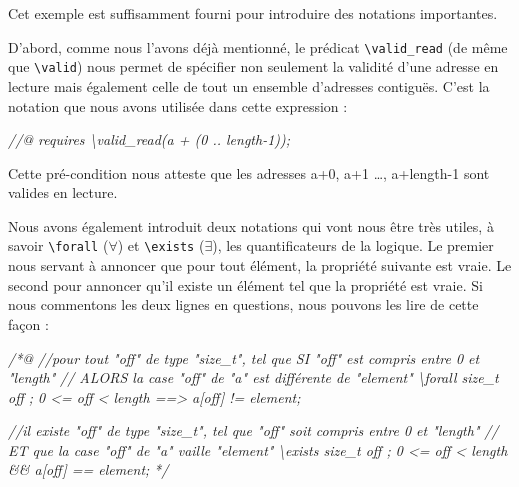 \documentclass[12pt,francais,]{scrbook}
\newenvironment{Shaded}{}{}
\newcommand{\CommentTok}[1]{\textcolor[rgb]{0.38,0.63,0.69}{\textit{{#1}}}}
\begin{document}
Cet exemple est suffisamment fourni pour introduire des notations
importantes.

D'abord, comme nous l'avons déjà mentionné, le prédicat
\texttt{\textbackslash{}valid\_read} (de même que
\texttt{\textbackslash{}valid}) nous permet de spécifier non seulement
la validité d'une adresse en lecture mais également celle de tout un
ensemble d'adresses contiguës. C'est la notation que nous avons utilisée
dans cette expression :

\begin{footnotesize}\begin{Shaded}
\begin{Highlighting}[]
\CommentTok{//@ requires \textbackslash{}valid_read(a + (0 .. length-1));}
\end{Highlighting}
\end{Shaded}\end{footnotesize}

Cette pré-condition nous atteste que les adresses a+0, a+1 \ldots{},
a+length-1 sont valides en lecture.

Nous avons également introduit deux notations qui vont nous être très
utiles, à savoir \texttt{\textbackslash{}forall} (\(\forall\)) et
\texttt{\textbackslash{}exists} (\(\exists\)), les quantificateurs de la
logique. Le premier nous servant à annoncer que pour tout élément, la
propriété suivante est vraie. Le second pour annoncer qu'il existe un
élément tel que la propriété est vraie. Si nous commentons les deux
lignes en questions, nous pouvons les lire de cette façon :

\begin{footnotesize}\begin{Shaded}
\begin{Highlighting}[]
\CommentTok{/*@}
\CommentTok{//pour tout "off" de type "size_t", tel que SI "off" est compris entre 0 et "length"}
\CommentTok{//                                 ALORS la case "off" de "a" est différente de "element"}
\CommentTok{\textbackslash{}forall size_t off ; 0 <= off < length ==> a[off] != element;}

\CommentTok{//il existe "off" de type "size_t", tel que "off" soit compris entre 0 et "length"}
\CommentTok{//                                 ET que la case "off" de "a" vaille "element"}
\CommentTok{\textbackslash{}exists size_t off ; 0 <= off < length && a[off] == element;}
\CommentTok{*/}
\end{Highlighting}
\end{Shaded}\end{footnotesize}
\end{document}
